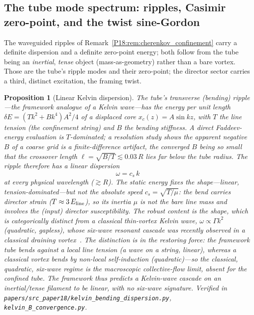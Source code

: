 \documentclass[11pt,a4paper]{article}
\newtheorem{proposition}[theorem]{Proposition}
\theoremstyle{definition}\newtheorem{definition}[theorem]{Definition}
\theoremstyle{remark}
\begin{document}
\subsection{The tube mode spectrum: ripples, Casimir zero-point, and the twist sine-Gordon}
\label{P18:sec:ripple_spectrum}

The waveguided ripples of Remark~\ref{P18:rem:cherenkov_confinement} carry a
definite dispersion and a definite zero-point energy; both follow from the tube
being an \emph{inertial}, \emph{tense} object (mass-as-geometry) rather than a
bare vortex. Those are the tube's ripple modes and their zero-point; the director
sector carries a third, distinct excitation, the framing twist.

\begin{proposition}[Linear Kelvin dispersion]
\label{P18:prop:linear_kelvin}
The tube's transverse (bending) ripple---the framework analogue of a Kelvin
wave---has the energy per unit length $\delta E=(T k^2+B k^4)A^2/4$ of a
displaced core $x_c(z)=A\sin kz$, with $T$ the line tension (the confinement
string) and $B$ the bending stiffness. A direct Faddeev-energy evaluation is
$T$-dominated; a resolution study shows the apparent negative $B$ of a coarse
grid is a finite-difference artifact, the converged $B$ being so small that the
crossover length $\ell=\sqrt{B/T}\lesssim0.03\,R$ lies far below the tube
radius. The ripple therefore has a \emph{linear} dispersion
\begin{equation}
  \omega = c_s\,k
  \label{P18:eq:linear_kelvin}
\end{equation}
at every physical wavelength ($\gtrsim R$). The static energy fixes the
\emph{shape}---linear, tension-dominated---but not the absolute speed
$c_s=\sqrt{T/\mu}$: the bend carries director strain ($T\approx3\,E_{\rm line}$),
so its inertia $\mu$ is not the bare line mass and involves the (input) director
susceptibility. The robust content is the shape, which is categorically distinct
from a classical thin-vortex Kelvin wave, $\omega\propto\Gamma k^2$ (quadratic,
gapless), whose six-wave resonant cascade was recently observed in a classical
draining vortex~\cite{Barckicke2026}. The distinction is in the restoring force:
the framework tube bends against a \emph{local} line tension (a wave on a string,
linear), whereas a classical vortex bends by \emph{non-local} self-induction
(quadratic)---so the classical, quadratic, six-wave regime is the macroscopic
collective-flow limit, absent for the confined tube. The
framework thus predicts a Kelvin-wave cascade on an inertial/tense filament to
be \emph{linear}, with no six-wave signature. Verified in
\texttt{papers/src\_paper18/kelvin\_bending\_dispersion.py},
\texttt{kelvin\_B\_convergence.py}.
\end{proposition}
\end{document}
